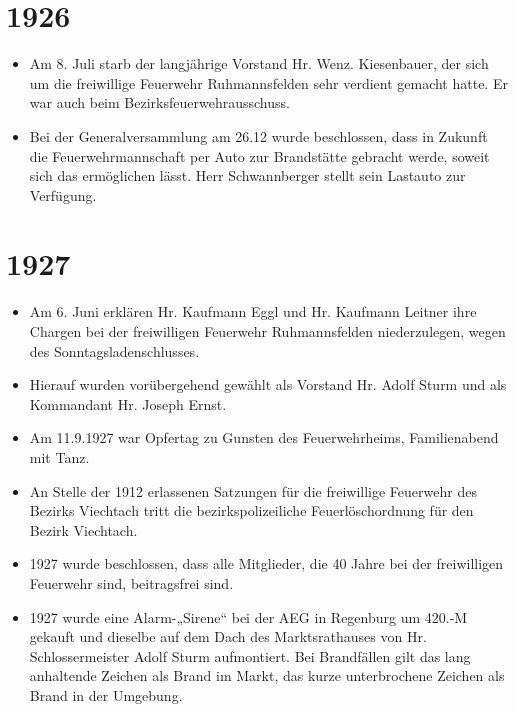 \documentclass[12pt,a4paper]{book}
\begin{document}
\section*{1926}

\begin{itemize}
\item Am 8. Juli starb der langjährige Vorstand Hr. Wenz. Kiesenbauer, der sich
um die freiwillige Feuerwehr Ruhmannsfelden sehr verdient gemacht hatte. Er war
auch beim Bezirksfeuerwehrausschuss.

\item Bei der Generalversammlung am 26.12 wurde beschlossen, dass in Zukunft die
Feuerwehrmannschaft per Auto zur Brandstätte gebracht werde, soweit sich das
ermöglichen lässt. Herr Schwannberger stellt sein Lastauto zur Verfügung.
\end{itemize}

\section*{1927}

\begin{itemize}
\item Am 6. Juni erklären Hr. Kaufmann Eggl und Hr. Kaufmann Leitner ihre
Chargen bei der freiwilligen Feuerwehr Ruhmannsfelden niederzulegen, wegen des
Sonntagsladenschlusses.

\item Hierauf wurden vorübergehend gewählt als Vorstand Hr. Adolf Sturm und als
Kommandant Hr. Joseph Ernst.

\item Am 11.9.1927 war Opfertag zu Gunsten des Feuerwehrheims, Familienabend mit
Tanz.

\item An Stelle der 1912 erlassenen Satzungen für die freiwillige Feuerwehr des
Bezirks Viechtach tritt die bezirkspolizeiliche Feuerlöschordnung für den Bezirk
Viechtach.

\item 1927 wurde beschlossen, dass alle Mitglieder, die 40 Jahre bei der
freiwilligen Feuerwehr sind, beitragsfrei sind.

\item 1927 wurde eine Alarm-„Sirene“ bei der AEG in Regenburg um 420.-M gekauft
und dieselbe auf dem Dach des Marktsrathauses von Hr. Schlossermeister Adolf
Sturm aufmontiert. Bei Brandfällen gilt das lang anhaltende Zeichen als Brand im
Markt, das kurze unterbrochene Zeichen als Brand in der Umgebung.
\end{itemize}
\end{document}
